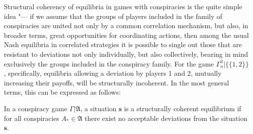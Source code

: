 Structural coherency of equilibria in games with conspiracies is the quite simple idea "--- if we assume that the groups of players included in the family of conspiracies are united not only by a common correlation mechanism, but also, in broader terms, great opportunities for coordinating actions, then among the usual Nash equilibria in correlated strategies it is possible to single out those that are resistant to deviations not only individually, but also collectively, bearing in mind exclusively the groups included in the conspiracy family. For the game $\Gamma^3_n | \{\{1,2\}\}$, specifically, equilibria allowing a deviation by players 1 and 2, mutually increasing their payoffs, will be structurally incoherent. In the most general terms, this can be expressed as follows: %
\begin{definition}
	In a conspiracy game $\Gamma | \mathfrak{A}$, a situation $\mathbf{s}$ is a structurally coherent equilibrium if for all conspiracies $A_* \in \mathfrak{A}$ there exist no acceptable deviations from the situation $\mathbf{s}$. %
\end{definition}


